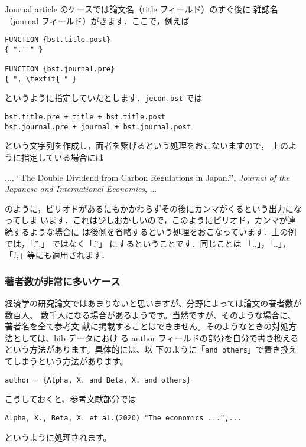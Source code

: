 \documentclass[article]{jlreq}
\begin{document}
Journal article のケースでは論文名（title フィールド）のすぐ後に
雑誌名（journal フィールド）がきます．ここで，例えば
\begin{screen}
\begin{verbatim}
FUNCTION {bst.title.post}
{ ".''" }

FUNCTION {bst.journal.pre}
{ ", \textit{ " }
\end{verbatim}
\end{screen}
というように指定していたとします．\texttt{jecon.bst} では
\begin{center}
\verb|bst.title.pre + title + bst.title.post| \\
\verb|bst.journal.pre + journal + bst.journal.post|
\end{center}
という文字列を作成し，両者を繋げるという処理をおこないますので，
上のように指定している場合には
\begin{flushleft}
 ..., ``The Double Dividend from Carbon Regulations in Japan\textbf{.'',} \textit{Journal of the Japanese and International Economies}, ...
\end{flushleft}
のように，ピリオドがあるにもかかわらずその後にカンマがくるという出力になってしま
います．これは少しおかしいので，このようにピリオド，カンマが連続するような場合に
は後側を省略するという処理をおこなっています．上の例では，「.'',」 ではなく「.''」
にするということです．同じことは 「.,」，「..」，「.',」等にも適用されます．

\subsubsection{著者数が非常に多いケース}

経済学の研究論文ではあまりないと思いますが、分野によっては論文の著者数が数百人、
数千人になる場合があるようです。当然ですが、そのような場合に、著者名を全て参考文
献に掲載することはできません。そのようなときの対処方法としては、bib データにおけ
る author フィールドの部分を自分で書き換えるという方法があります。具体的には、以
下のように「\texttt{and others}」で置き換えてしまうという方法があります。
\begin{screen}
\begin{verbatim}
author = {Alpha, X. and Beta, X. and others}
\end{verbatim}
\end{screen}
こうしておくと、参考文献部分では
\begin{screen}
\begin{verbatim}
Alpha, X., Beta, X. et al.(2020) "The economics ...",...
\end{verbatim}
\end{screen}
というように処理されます。
\end{document}
